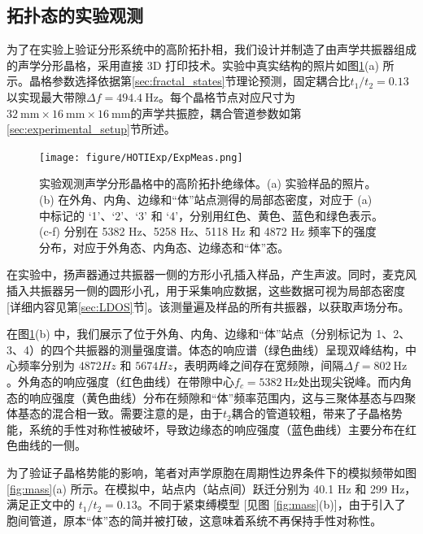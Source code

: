 \subsection{拓扑态的实验观测}
为了在实验上验证分形系统中的高阶拓扑相，我们设计并制造了由声学共振器组成的声学分形晶格，采用直接 3D 打印技术。实验中真实结构的照片如图\ref{fig:ExpMeas}(a) 所示。晶格参数选择依据第\ref{sec:fractal_states}节理论预测，固定耦合比$t_1/t_2=0.13$以实现最大带隙$\Delta f=494.4\ \mathrm{Hz}$。每个晶格节点对应尺寸为$32\ \mathrm{mm}\times16\ \mathrm{mm}\times16\ \mathrm{mm}$的声学共振腔，耦合管道参数如第\ref{sec:experimental_setup}节所述。
\begin{figure}[htbp]
    \centering
    \texttt{[image: figure/HOTIExp/ExpMeas.png]}
    \caption{实验观测声学分形晶格中的高阶拓扑绝缘体。(a) 实验样品的照片。(b) 在外角、内角、边缘和“体”站点测得的局部态密度，对应于 (a) 中标记的 ‘1’、‘2’、‘3’ 和 ‘4’，分别用红色、黄色、蓝色和绿色表示。(c-f) 分别在 5382 Hz、5258 Hz、5118 Hz 和 4872 Hz 频率下的强度分布，对应于外角态、内角态、边缘态和“体”态。}
    \label{fig:ExpMeas}
\end{figure}
在实验中，扬声器通过共振器一侧的方形小孔插入样品，产生声波。同时，麦克风插入共振器另一侧的圆形小孔，用于采集响应数据，这些数据可视为局部态密度[详细内容见第\ref{sec:LDOS}节]。该测量遍及样品的所有共振器，以获取声场分布。

在图\ref{fig:ExpMeas}(b) 中，我们展示了位于外角、内角、边缘和“体”站点（分别标记为 1、2、3、4）的四个共振器的测量强度谱。体态的响应谱（绿色曲线）呈现双峰结构，中心频率分别为 $4872 Hz$ 和 $5674 Hz$，表明两峰之间存在宽频隙，间隔$\Delta f=802\ \mathrm{Hz}$。外角态的响应强度（红色曲线）在带隙中心$f_c=5382\ \mathrm{Hz}$处出现尖锐峰。而内角态的响应强度（黄色曲线）分布在频隙和“体”频率范围内，这与三聚体基态与四聚体基态的混合相一致。需要注意的是，由于$t_2$耦合的管道较粗，带来了子晶格势能，系统的手性对称性被破坏，导致边缘态的响应强度（蓝色曲线）主要分布在红色曲线的一侧。

为了验证子晶格势能的影响，笔者对声学原胞在周期性边界条件下的模拟频带如图 \ref{fig:mass}(a) 所示。在模拟中，站点内（站点间）跃迁分别为 40.1 Hz 和 299 Hz，满足正文中的 \( t_1/t_2 = 0.13 \)。不同于紧束缚模型 [见图 \ref{fig:mass}(b)]，由于引入了胞间管道，原本“体”态的简并被打破，这意味着系统不再保持手性对称性。

